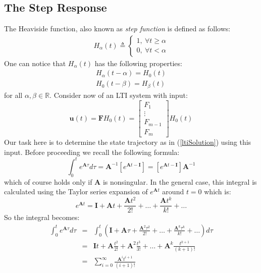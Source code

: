 \documentclass[a4paper,10pt,oneside]{book}
\begin{document}
\subsection{The Step Response}
The Heaviside function, also known as \emph{step function} is defined as follows:
\begin{eqnarray}
 H_\alpha(t)\triangleq\left\{ {\begin{array}{c}
 1,\ \forall t\geq \alpha\\
 0,\ \forall t<\alpha \end{array} } \right.
\end{eqnarray}
One can notice that $H_\alpha(t)$ has the following properties:
\begin{eqnarray}
 H_\alpha(t-\alpha)=H_0(t)\\
 H_0(t-\beta)=H_\beta(t)
\end{eqnarray}
for all $\alpha,\beta\in \mathbb{R}$.
Consider now of an LTI system with input:
\begin{equation}
 \mathbf{u}(t)=\mathbf{F}H_0(t)=\left[ {\begin{array}{c}
 F_1\\
 \vdots\\
 F_{m-1}\\
 F_m\end{array} } \right]H_0(t)
\end{equation}
Our task here is to determine the state trajectory as in (\ref{ltiSolution}) using this input. Before proceeding we recall the following formula:
\begin{equation}
 \int_{0}^t { e^{\mathbf{A}\tau} }d\tau=\mathbf{A}^{-1}\left[e^{\mathbf{A}t-\mathbf{I}}\right]=\left[e^{\mathbf{A}t-\mathbf{I}}\right]\mathbf{A}^{-1}\label{EXP-INT}
\end{equation}
which of course holds only if $\mathbf{A}$ is nonsingular. In the general case, this integral is calculated using the Taylor series expansion of $e^{\mathbf{A}t}$ around $t=0$ which is:
\begin{equation}
 e^{\mathbf{A}t}=\mathbf{I}+\mathbf{A}t+\frac{\mathbf{A}t^2}{2!}+\ldots+\frac{\mathbf{A}t^k}{k!}+\ldots
\end{equation}
So the integral becomes:
\begin{eqnarray}
 \int_{0}^t { e^{\mathbf{A}\tau} }d\tau&=&\int_{0}^t \left( \mathbf{I}+\mathbf{A}\tau+\frac{\mathbf{A}^2\tau^2}{2!}+\ldots+\frac{\mathbf{A}^k\tau^k}{k!}+\ldots \right) d\tau\\
		&=&\mathbf{I}t+\mathbf{A}\frac{t^2}{2!}+\mathbf{A}^2\frac{t^3}{3!}+\ldots+\mathbf{A}^k\frac{t^{k+1}}{(k+1)!}\\
&=& \sum_{i=0}^{\infty}{\frac{\mathbf{A}^i t^{i+1}}{(i+1)!}}\label{EXP-INT-SERIES}
\end{eqnarray}
\end{document}
